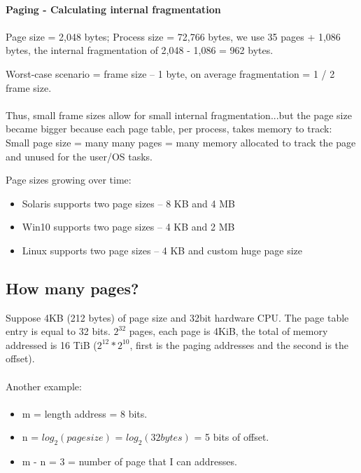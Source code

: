 \paragraph{Paging - Calculating internal fragmentation}
\paragraph{}
Page size = 2,048 bytes; Process size = 72,766 bytes, we use 35 pages + 1,086 bytes, the internal fragmentation of 2,048 - 1,086 = 962 bytes.

Worst-case scenario = frame size – 1 byte, on average fragmentation = 1 / 2 frame size.

\paragraph{}
Thus, small frame sizes allow for small internal fragmentation...but the page size became bigger because each page table, per process, takes memory to track: Small page size = many many pages = many memory allocated to track the page and unused for the user/OS tasks.

Page sizes growing over time:

\begin{itemize}
    \item Solaris supports two page sizes – 8 KB and 4 MB
    \item Win10 supports two page sizes – 4 KB and 2 MB
    \item Linux supports two page sizes – 4 KB and custom huge page size
\end{itemize}
\newpage
\subsection{How many pages?}
Suppose 4KB (212 bytes) of page size and 32bit hardware CPU. The page table entry is equal to 32 bits. $2^{32}$ pages, each page is 4KiB, the total of memory addressed is 16 TiB ($2^{12} * 2^{10}$, first is the paging addresses and the second is the offset).

\paragraph{}
Another example:
\paragraph{}

\begin{itemize}
\centering
    \item[] m = length address = 8 bits.
    \item[] n = $log_2(page size)$ = $log_2(32 bytes)$ = 5 bits of offset.
    \item[] m - n = 3 = number of page that I can addresses.
\end{itemize}

